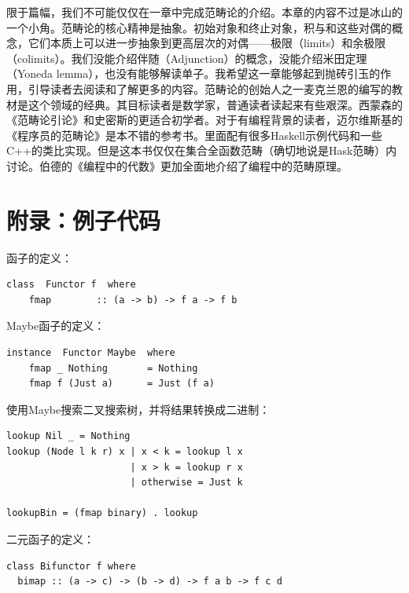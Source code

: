 \documentclass[b5paper]{ctexart}
\begin{document}
限于篇幅，我们不可能仅仅在一章中完成范畴论的介绍。本章的内容不过是冰山的一个小角。范畴论的核心精神是抽象。初始对象和终止对象，积与和这些对偶的概念，它们本质上可以进一步抽象到更高层次的对偶——极限（limits）和余极限（colimits）。我们没能介绍伴随（Adjunction）的概念，没能介绍米田定理（Yoneda lemma），也没有能够解读单子。我希望这一章能够起到抛砖引玉的作用，引导读者去阅读和了解更多的内容。范畴论的创始人之一麦克兰恩的编写的教材\cite{Mac-Lane-1998}是这个领域的经典。其目标读者是数学家，普通读者读起来有些艰深。西蒙森的《范畴论引论》\cite{Simmons2011}和史密斯的\cite{PeterSmith2018}更适合初学者。对于有编程背景的读者，迈尔维斯基的《程序员的范畴论》\cite{Milewski2018}是本不错的参考书。里面配有很多Haskell示例代码和一些C++的类比实现。但是这本书仅仅在集合全函数范畴（确切地说是Hask范畴）内讨论。伯德的《编程中的代数》\cite{Bird97}更加全面地介绍了编程中的范畴原理。


\section{附录：例子代码}

函子的定义：

\lstset{frame=single}
\begin{lstlisting}[style=Haskell]
class  Functor f  where
    fmap        :: (a -> b) -> f a -> f b
\end{lstlisting}

Maybe函子的定义：

\begin{lstlisting}
instance  Functor Maybe  where
    fmap _ Nothing       = Nothing
    fmap f (Just a)      = Just (f a)
\end{lstlisting}

使用Maybe搜索二叉搜索树，并将结果转换成二进制：

\begin{lstlisting}[style=Haskell]
lookup Nil _ = Nothing
lookup (Node l k r) x | x < k = lookup l x
                      | x > k = lookup r x
                      | otherwise = Just k

lookupBin = (fmap binary) . lookup
\end{lstlisting}

二元函子的定义：

\begin{lstlisting}
class Bifunctor f where
  bimap :: (a -> c) -> (b -> d) -> f a b -> f c d
\end{lstlisting}
\end{document}
